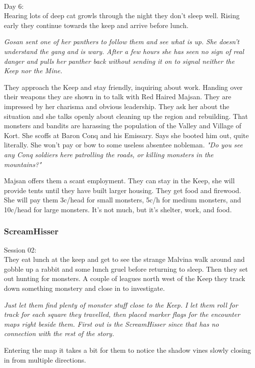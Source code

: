\

Day 6:\\
Hearing lots of deep cat growls through the night they don't sleep well. Rising early they continue towards the keep and arrive before lunch.

\textit{Gosan sent one of her panthers to follow them and see what is up. She doesn't understand the gang and is wary. After a few hours she has seen no sign of real danger and pulls her panther back without sending it on to signal neither the Keep nor the Mine.}

They approach the Keep and stay friendly, inquiring about work. Handing over their weapons they are shown in to talk with Red Haired Majsan. They are impressed by her charisma and obvious leadership. They ask her about the situation and she talks openly about cleaning up the region and rebuilding. That monsters and bandits are harassing the population of the Valley and Village of Kort. She scoffs at Baron Conq and his Emissary. Says she booted him out, quite literally. She won't pay or bow to some useless absentee nobleman. \textit{"Do you see any Conq soldiers here patrolling the roads, or killing monsters in the mountains?"}

Majsan offers them a scant employment. They can stay in the Keep, she will provide tents until they have built larger housing. They get food and firewood. She will pay them 3c/head for small monsters, 5c/h for medium monsters, and 10c/head for large monsters. It's not much, but it's shelter, work, and food.


\subsubsection*{ScreamHisser}
\forceindent Session 02:\\                                              %
They eat lunch at the keep and get to see the strange Malvina walk around and gobble up a rabbit and some lunch gruel before returning to sleep. Then they set out hunting for monsters.
A couple of leagues north west of the Keep they track down something monstery and close in to investigate.

\textit{Just let them find plenty of monster stuff close to the Keep. I let them roll for track for each square they travelled, then placed marker flags for the encounter maps right beside them. First out is the ScreamHisser since that has no connection with the rest of the story.}

Entering the map it takes a bit for them to notice the shadow vines slowly closing in from multiple directions.


